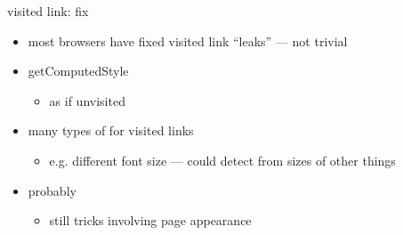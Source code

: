 \begin{frame}[fragile,label=visitedLinksFix]{visited link: fix}
    \begin{itemize}
    \item most browsers have fixed visited link ``leaks'' --- not trivial
    \item getComputedStyle 
        \begin{itemize}
        \item as if unvisited
        \end{itemize}
    \item many types of  for visited links
        \begin{itemize}
        \item e.g. different font size --- could detect from sizes of other things
        \end{itemize}
    \item probably 
        \begin{itemize}
            \item still tricks involving page appearance
        \end{itemize}
    \end{itemize}
\end{frame}
